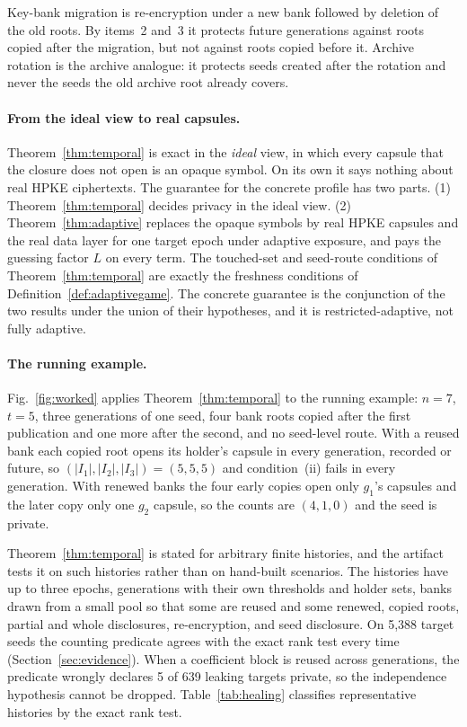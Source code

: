 \documentclass[pdflatex,sn-mathphys-num]{sn-jnl}%
\theoremstyle{plain}
\theoremstyle{definition}
\begin{document}
Key-bank migration is re-encryption under a new bank followed by deletion of the old roots. By items~2 and~3 it protects future generations against roots copied after the migration, but not against roots copied before it. Archive rotation is the archive analogue: it protects seeds created after the rotation and never the seeds the old archive root already covers.

\paragraph{From the ideal view to real capsules.}
Theorem~\ref{thm:temporal} is exact in the \emph{ideal} view, in which every capsule that the closure does not open is an opaque symbol. On its own it says nothing about real HPKE ciphertexts. The guarantee for the concrete profile has two parts. (1) Theorem~\ref{thm:temporal} decides privacy in the ideal view. (2) Theorem~\ref{thm:adaptive} replaces the opaque symbols by real HPKE capsules and the real data layer for one target epoch under adaptive exposure, and pays the guessing factor $L$ on every term. The touched-set and seed-route conditions of Theorem~\ref{thm:temporal} are exactly the freshness conditions of Definition~\ref{def:adaptivegame}. The concrete guarantee is the conjunction of the two results under the union of their hypotheses, and it is restricted-adaptive, not fully adaptive.

\paragraph{The running example.}
Fig.~\ref{fig:worked} applies Theorem~\ref{thm:temporal} to the running example: $n=7$, $t=5$, three generations of one seed, four bank roots copied after the first publication and one more after the second, and no seed-level route. With a reused bank each copied root opens its holder's capsule in every generation, recorded or future, so $(|I_1|,|I_2|,|I_3|)=(5,5,5)$ and condition~(ii) fails in every generation. With renewed banks the four early copies open only $g_1$'s capsules and the later copy only one $g_2$ capsule, so the counts are $(4,1,0)$ and the seed is private.


Theorem~\ref{thm:temporal} is stated for arbitrary finite histories, and the artifact tests it on such histories rather than on hand-built scenarios. The histories have up to three epochs, generations with their own thresholds and holder sets, banks drawn from a small pool so that some are reused and some renewed, copied roots, partial and whole disclosures, re-encryption, and seed disclosure. On 5,388 target seeds the counting predicate agrees with the exact rank test every time (Section~\ref{sec:evidence}). When a coefficient block is reused across generations, the predicate wrongly declares 5 of 639 leaking targets private, so the independence hypothesis cannot be dropped. Table~\ref{tab:healing} classifies representative histories by the exact rank test.
\end{document}
